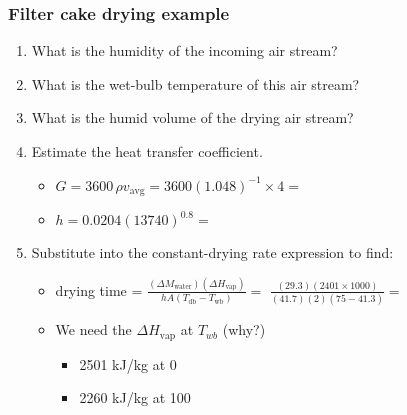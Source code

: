 \begin{frame}\frametitle{Filter cake drying example}
	\begin{enumerate}
		\item	What is the humidity of the incoming air stream? {\scriptsize \color{myOrange}{[$\psi$ = 0.04 kg water/kg dry air]}}
		\item	What is the wet-bulb temperature of this air stream? {\scriptsize {}}		
		\item	What is the humid volume of the drying air stream? {\scriptsize \color{myOrange}{[$T=348$K, $v_H = 1.048 \text{m}^3\text{/kg}$]}}
		\item	Estimate the heat transfer coefficient.
		\begin{itemize}
			\item	$G = 3600\, \rho v_\text{avg} = 3600 (1.048)^{-1} \times 4 =$  {}
			\item	$h = 0.0204 (13740)^{0.8} =$ {}
		\end{itemize}
		\item	Substitute into the constant-drying rate expression to find:
		\begin{itemize}
			\item	drying time = $\displaystyle  \frac{(\Delta M_\text{water}) (\Delta H_\text{vap})}{hA(T_\text{db} - T_\text{wb})} =$ {\scriptsize $\displaystyle \frac{(29.3)(2401\times 1000)}{(41.7)(2)(75-41.3)} =$} {\tiny {}}

			\vspace{12pt}
			\item	We need the $\Delta H_\text{vap}$ at $T_{wb}$ (why?) {\small \color{myOrange}{[2401 kJ/kg]}}
			\begin{itemize}
				\item	2501 kJ/kg at 0\degC
				\item	2260 kJ/kg at 100\degC
			\end{itemize}
		\end{itemize}
		
	\end{enumerate}
\end{frame}


